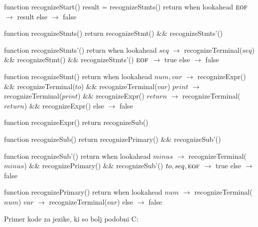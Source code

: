 \documentclass{report}
\newcommand{\EOF}{\textsc{eof}}
\newlength{\arrow}
\newcommand{\T}[1]{{#1}}
\begin{document}
\newpage
\begin{algorithm}
  function recognizeStart()
    result = recognizeStmts()
    return when lookahead
      $\EOF$ $\rightarrow$ result
      else $\rightarrow$ false

  function recognizeStmts()
    return recognizeStmt() $\&\&$ recognizeStmts'()

  function recognizeStmts'()
    return when lookahead
      $\T{seq}$ $\rightarrow$ recognizeTerminal($\T{seq}$) $\&\&$ recognizeStmt() $\&\&$ recognizeStmts'()
      $\EOF$ $\rightarrow$ true
      else $\rightarrow$ false

  function recognizeStmt()
    return when lookahead
      $\T{num}, \T{var}$ $\rightarrow$ recognizeExpr() $\&\&$ recognizeTerminal($\T{to}$) $\&\&$ recognizeTerminal($\T{var}$)
      $\T{print}$ $\rightarrow$ recognizeTerminal($\T{print}$) $\&\&$ recognizeExpr()
      $\T{return}$ $\rightarrow$ recognizeTerminal($\T{return}$) $\&\&$ recognizeExpr()
      else $\rightarrow$ false

  function recognizeExpr()
    return recognizeSub()

  function recognizeSub()
    return recognizePrimary() $\&\&$ recognizeSub'()

  function recognizeSub'()
    return when lookahead
      $\T{minus}$ $\rightarrow$ recognizeTerminal($\T{minus}$) $\&\&$ recognizePrimary() $\&\&$  recognizeSub'()
      $\T{to}, \T{seq}, \EOF$ $\rightarrow$ true
      else $\rightarrow$ false

  function recognizePrimary()
    return when lookahead
      $\T{num}$ $\rightarrow$ recognizeTerminal($\T{num}$)
      $\T{var}$ $\rightarrow$ recognizeTerminal($\T{var}$)
      else $\rightarrow$ false
\end{algorithm}

\newpage
Primer kode za jezike, ki so bolj podobni C:
\end{document}
